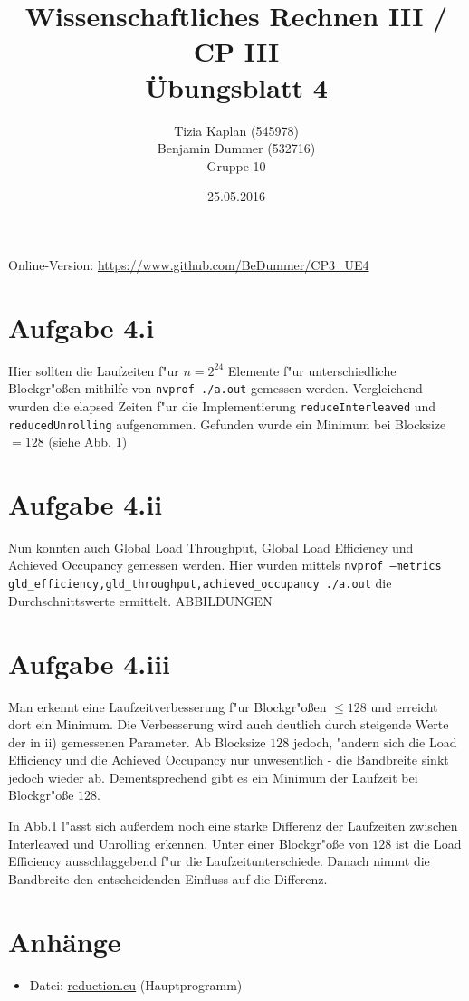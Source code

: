 \documentclass[%
	paper=A4,	%
	pagesize,	%
	DIV=calc,	%
	smallheadings,	%
	ngerman		%
]{scrartcl}
\title{{\bf Wissenschaftliches Rechnen III / CP III}\\Übungsblatt 4}
\author{Tizia Kaplan (545978)\\Benjamin Dummer (532716)\\ Gruppe 10}
\date{25.05.2016}
\begin{document}
\maketitle
Online-Version: \href{https://www.github.com/BeDummer/CP3_UE4}{\url{https://www.github.com/BeDummer/CP3_UE4}}

\section*{Aufgabe 4.i}
Hier sollten die Laufzeiten f"ur $n=2^24$ Elemente f"ur unterschiedliche Blockgr"o\ss en mithilfe von \texttt{nvprof ./a.out} gemessen werden. Vergleichend wurden die elapsed Zeiten f"ur die Implementierung \texttt{reduceInterleaved} und \texttt{reducedUnrolling} aufgenommen. Gefunden wurde ein Minimum bei Blocksize $=128$ (siehe Abb. 1) 

\section*{Aufgabe 4.ii}
Nun konnten auch Global Load Throughput, Global Load Efficiency und Achieved Occupancy gemessen werden. Hier wurden mittels \texttt{nvprof --metrics gld_efficiency,gld_throughput,achieved_occupancy ./a.out} die Durchschnittswerte ermittelt.
ABBILDUNGEN

\section*{Aufgabe 4.iii}
Man erkennt eine Laufzeitverbesserung f"ur Blockgr"o\ss en $\leq 128$ und erreicht dort ein Minimum. Die Verbesserung wird auch deutlich durch steigende Werte der in ii) gemessenen Parameter. Ab Blocksize $128$ jedoch, "andern sich die Load Efficiency und die Achieved Occupancy nur unwesentlich - die Bandbreite sinkt jedoch wieder ab. Dementsprechend gibt es ein Minimum der Laufzeit bei Blockgr"o\ss e $128$.

In Abb.1 l"asst sich au\ss erdem noch eine starke Differenz der Laufzeiten zwischen Interleaved und Unrolling erkennen. Unter einer Blockgr"o\ss e von $128$ ist die Load Efficiency ausschlaggebend f"ur die Laufzeitunterschiede. Danach nimmt die Bandbreite den entscheidenden Einfluss auf die Differenz.


\section*{Anhänge}
\begin{itemize}
	\item Datei: \url{reduction.cu} (Hauptprogramm)
\end{itemize}
\end{document}
